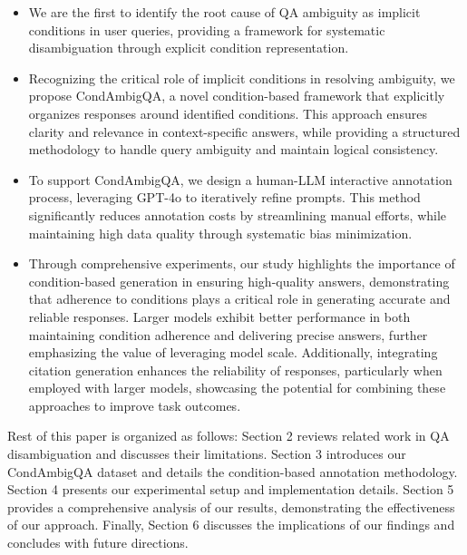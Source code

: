 \begin{itemize}
\item  We are the first to identify the root cause of QA ambiguity as implicit conditions in user queries, providing a framework for systematic disambiguation through explicit condition representation.

\item Recognizing the critical role of implicit conditions in resolving ambiguity, we propose CondAmbigQA, a novel condition-based framework that explicitly organizes responses around identified conditions. This approach ensures clarity and relevance in context-specific answers, while providing a structured methodology to handle query ambiguity and maintain logical consistency.

\item To support CondAmbigQA, we design a human-LLM interactive annotation process, leveraging GPT-4o to iteratively refine prompts. This method significantly reduces annotation costs by streamlining manual efforts, while maintaining high data quality through systematic bias minimization.

\item Through comprehensive experiments, our study highlights the importance of condition-based generation in ensuring high-quality answers, demonstrating that adherence to conditions plays a critical role in generating accurate and reliable responses. Larger models exhibit better performance in both maintaining condition adherence and delivering precise answers, further emphasizing the value of leveraging model scale. Additionally, integrating citation generation enhances the reliability of responses, particularly when employed with larger models, showcasing the potential for combining these approaches to improve task outcomes.
\end{itemize}

Rest of this paper is organized as follows: Section 2 reviews related work in QA disambiguation and discusses their limitations. Section 3 introduces our CondAmbigQA dataset and details the condition-based annotation methodology. Section 4 presents our experimental setup and implementation details. Section 5 provides a comprehensive analysis of our results, demonstrating the effectiveness of our approach. Finally, Section 6 discusses the implications of our findings and concludes with future directions.